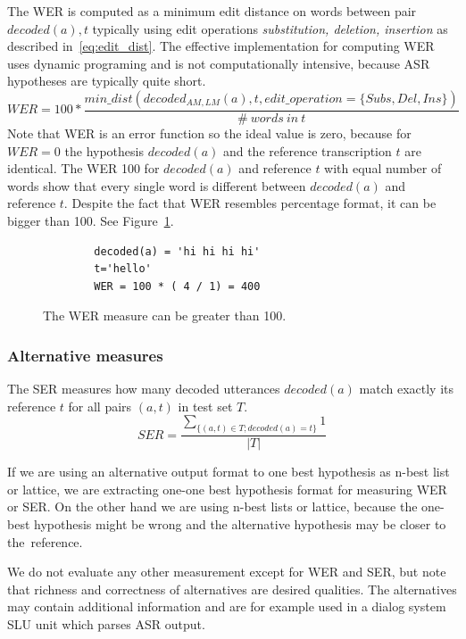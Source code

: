 {The \ac{WER} is computed as a minimum edit distance on words between 
pair $decoded(a), t$ typically using edit operations {\it substitution, deletion, insertion}\/ as described in~\ref{eq:edit_dist}.
The effective implementation for computing WER uses dynamic programing and is not computationally intensive,
because \ac{ASR} hypotheses are typically quite short.
\begin{equation} \label{eq:edit_dist}
    WER = 100* \frac{min\_dist(decoded_{AM, LM}(a), t, edit\_operation=\{Subs, Del, Ins\})}{\#\ words\ in\ t}
\end{equation}
Note that \ac{WER} is an error function so the ideal value is zero, because for $WER=0$ the hypothesis $decoded(a)$ and 
the reference transcription $t$ are identical. The \ac{WER} 100 for $decoded(a)$ and reference $t$ 
with equal number of words show that every single word is different between $decoded(a)$ and reference $t$.
Despite the fact that \ac{WER} resembles percentage format, it can be bigger than 100. See Figure~\ref{fig:wer400}.
\begin{figure}[!htp]
    \begin{center}
    \begin{verbatim}
        decoded(a) = 'hi hi hi hi'
        t='hello'
        WER = 100 * ( 4 / 1) = 400
    \end{verbatim}
    \caption{The \acs{WER} measure can be greater than 100.}
    \label{fig:wer400} 
    \end{center}
\end{figure}

\subsubsection*{Alternative measures}
The \acl{SER} measures how many decoded utterances $decoded(a)$ match exactly its reference $t$
for all pairs $(a, t)$ in test set $T$.
\begin{equation}
    SER = \frac{\sum_{\{(a, t) \in T; decoded(a) = t\}}{1}}{|T|}
\end{equation}

If we are using an alternative output format to one best hypothesis as n-best list or lattice,
we are extracting one-one best hypothesis format for measuring \ac{WER} or \ac{SER}.
On the other hand we are using n-best lists or lattice,
because the one-best hypothesis might be wrong and the alternative
hypothesis may be closer to the~reference.

We do not evaluate any other measurement except for \ac{WER} and \ac{SER},
but note that richness and correctness of alternatives are desired qualities.
The alternatives may contain additional information and are for example used
in a dialog system \acl{SLU} unit which parses \ac{ASR} output.

}
